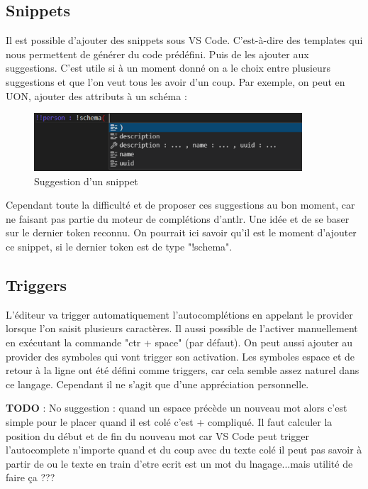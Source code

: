 \documentclass[
    iict, %
    il, %
]{heig-tb}
\begin{document}
\subsection{Snippets}
Il est possible d'ajouter des snippets sous VS Code. C'est-à-dire des templates qui nous permettent de générer du code prédéfini. Puis de les ajouter aux suggestions.
C'est utile si à un moment donné on a le choix entre plusieurs suggestions et que l'on veut tous les avoir d'un coup.
Par exemple, on peut en UON, ajouter des attributs à un schéma :

\begin{figure}[!h]
    \begin{center}
        \includegraphics[width=10cm]{assets/figures/snippet-suggestion.png}
    \end{center}
    \caption[Suggestion d'un snippet]{\label{snippet-suggestion} Suggestion d'un snippet}
\end{figure}

Cependant toute la difficulté et de proposer ces suggestions au bon moment, car ne faisant pas partie du moteur de complétions d'antlr. Une idée et de se baser sur le dernier token reconnu. On pourrait ici savoir qu'il est le moment d'ajouter ce snippet, si le dernier token est de type "!schema".

\subsection{Triggers}
L'éditeur va trigger automatiquement l'autocomplétions en appelant le provider lorsque l'on saisit plusieurs caractères. Il aussi possible de l'activer manuellement en exécutant la commande "ctr + space" (par défaut).
On peut aussi ajouter au provider des symboles qui vont trigger son activation. Les symboles espace et de retour à la ligne ont été défini comme triggers, car cela semble assez naturel dans ce langage. Cependant il ne s'agit que d'une appréciation personnelle.

\textbf{TODO} :
No suggestion :
quand un espace précède un nouveau mot alors c'est simple pour le placer
quand il est colé c'est + compliqué. Il faut calculer la position du début et de fin du nouveau mot car VS Code peut trigger l'autocomplete n'importe quand et du coup
avec du texte colé il peut pas savoir à partir de ou le texte en train d'etre ecrit est un mot du lnagage...mais utilité de faire ça ???
\end{document}
